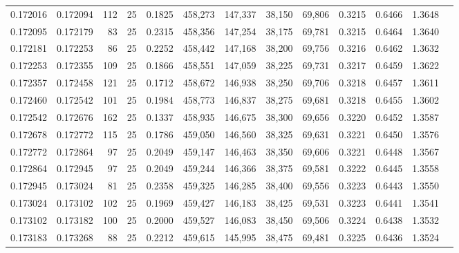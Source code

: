 \begin{tabular}{rrrrrrrrrrrrr}
0.172016 & 0.172094 &   112 &  25 &                                     0.1825 & 458,273 & 147,337 &  38,150 &  69,806 & 0.3215 & 0.6466 & 1.3648 \\
0.172095 & 0.172179 &    83 &  25 &                                     0.2315 & 458,356 & 147,254 &  38,175 &  69,781 & 0.3215 & 0.6464 & 1.3640 \\
0.172181 & 0.172253 &    86 &  25 &                                     0.2252 & 458,442 & 147,168 &  38,200 &  69,756 & 0.3216 & 0.6462 & 1.3632 \\
0.172253 & 0.172355 &   109 &  25 &                                     0.1866 & 458,551 & 147,059 &  38,225 &  69,731 & 0.3217 & 0.6459 & 1.3622 \\
0.172357 & 0.172458 &   121 &  25 &                                     0.1712 & 458,672 & 146,938 &  38,250 &  69,706 & 0.3218 & 0.6457 & 1.3611 \\
0.172460 & 0.172542 &   101 &  25 &                                     0.1984 & 458,773 & 146,837 &  38,275 &  69,681 & 0.3218 & 0.6455 & 1.3602 \\
0.172542 & 0.172676 &   162 &  25 &                                     0.1337 & 458,935 & 146,675 &  38,300 &  69,656 & 0.3220 & 0.6452 & 1.3587 \\
0.172678 & 0.172772 &   115 &  25 &                                     0.1786 & 459,050 & 146,560 &  38,325 &  69,631 & 0.3221 & 0.6450 & 1.3576 \\
0.172772 & 0.172864 &    97 &  25 &                                     0.2049 & 459,147 & 146,463 &  38,350 &  69,606 & 0.3221 & 0.6448 & 1.3567 \\
0.172864 & 0.172945 &    97 &  25 &                                     0.2049 & 459,244 & 146,366 &  38,375 &  69,581 & 0.3222 & 0.6445 & 1.3558 \\
0.172945 & 0.173024 &    81 &  25 &                                     0.2358 & 459,325 & 146,285 &  38,400 &  69,556 & 0.3223 & 0.6443 & 1.3550 \\
0.173024 & 0.173102 &   102 &  25 &                                     0.1969 & 459,427 & 146,183 &  38,425 &  69,531 & 0.3223 & 0.6441 & 1.3541 \\
0.173102 & 0.173182 &   100 &  25 &                                     0.2000 & 459,527 & 146,083 &  38,450 &  69,506 & 0.3224 & 0.6438 & 1.3532 \\
0.173183 & 0.173268 &    88 &  25 &                                     0.2212 & 459,615 & 145,995 &  38,475 &  69,481 & 0.3225 & 0.6436 & 1.3524 \\

\end{tabular}

